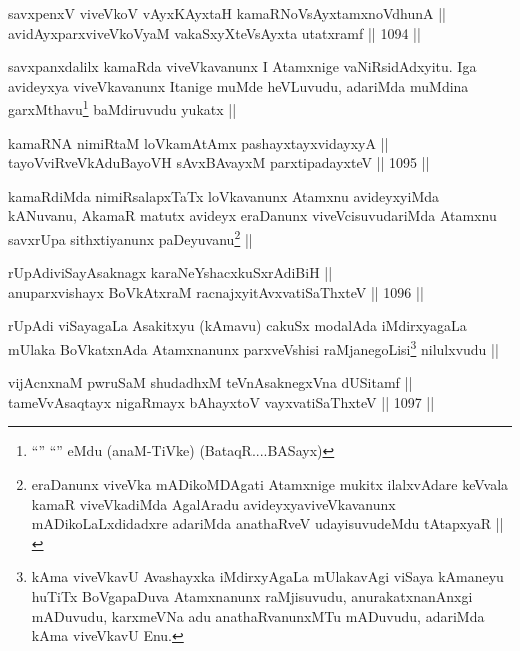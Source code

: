 \begin{shl}
savxpenxV viveVkoV vAyxKAyxtaH kamaRNoV\s sAyx\s \s tamxnoV\s dhunA || \\
avidAyxparxviveVkoV\s yaM vakaSxyXteV\s sAyxta utatxramf ||  1094 ||  
\end{shl}

\begin{artha}
savxpanxdalilx kamaRda viveVkavanunx I Atamxnige vaNiRsidAdxyitu. Iga avideyxya viveVkavanunx Itanige muMde heVLuvudu, adariMda muMdina garxMthavu\footnote{``\stext'' ``\stext'' eMdu (anaM-TiVke) (BataqR....BASayx)} baMdiruvudu yukatx ||
\end{artha}


\begin{shl}
kamaRNA nimiRtaM loVkamAtAmx pashayxtayxvidayxyA || \\
tayoVviRveVkAduBayoVH sAvxBAvayxM parxtipadayxteV ||  1095 ||  
\end{shl}

\begin{artha}
kamaRdiMda nimiRsalapxTaTx loVkavanunx Atamxnu avideyxyiMda kANuvanu, AkamaR matutx avideyx eraDanunx viveVcisuvudariMda Atamxnu savxrUpa sithxtiyanunx paDeyuvanu\footnote{eraDanunx viveVka mADikoMDAgati Atamxnige mukitx ilalxvAdare keVvala kamaR viveVkadiMda AgalAradu avideyxyaviveVkavanunx mADikoLaLxdidadxre adariMda anathaRveV udayisuvudeMdu tAtapxyaR ||} ||
\end{artha}


\begin{shl}
rUpAdiviSayAsaknagx karaNeYshacxkuSxrAdiBiH || \\
anuparxvishayx BoVkAtxraM racnajxyitAvx\s vatiSaThxteV ||  1096 ||  
\end{shl}

\begin{artha}
rUpAdi viSayagaLa Asakitxyu (kAmavu) cakuSx modalAda iMdirxyagaLa mUlaka BoVkatxnAda Atamxnanunx parxveVshisi raMjanegoLisi\footnote{kAma viveVkavU Avashayxka iMdirxyAgaLa mUlakavAgi viSaya kAmaneyu huTiTx BoVgapaDuva Atamxnanunx raMjisuvudu, anurakatxnanAnxgi mADuvudu, karxmeVNa adu anathaRvanunxMTu mADuvudu, adariMda kAma viveVkavU Enu.} nilulxvudu ||
\end{artha}

\begin{shl}
vijAcnxnaM pwruSaM shudadhxM teVnA\s \s saknegxVna dUSitamf || \\
tameVvA\s \s saqtayx nigaRmayx bAhayxtoV vayxvatiSaThxteV ||  1097 ||  
\end{shl}

